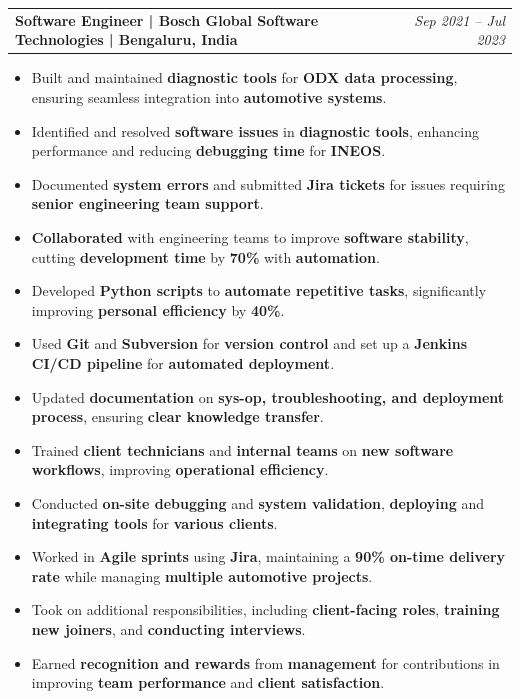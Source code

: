 \documentclass[a4paper,11pt]{article}
\makeatletter
\newcommand{\resumeExp}[2]{
\vspace{0mm}\item[]
    \begin{tabular*}{\textwidth}[t]{l@{\extracolsep{\fill}}r}
        \hspace{-4.4mm} \small\textbf{#1} & {\footnotesize{#2}} \vspace{-1.2mm} %
    \end{tabular*}
    \vspace*{-7mm}
}
\newcommand{\resumeItemListStart}{\begin{justify}\begin{itemize}[leftmargin=1.5ex, rightmargin=2ex, noitemsep,labelsep=1.2mm,itemsep=1mm]\small}
\newcommand{\resumeItemListEnd}{\end{itemize}\end{justify}}%
\makeatother
\begin{document}
\resumeExp
{Software Engineer\textnormal{ | Bosch Global Software Technologies | Bengaluru, India}}
{\textit{Sep 2021 – Jul 2023}}
\resumeItemListStart
\item[$\bullet$] Built and maintained \textbf{diagnostic tools} for \textbf{ODX data processing}, ensuring seamless integration into \textbf{automotive systems}.
\item[$\bullet$] Identified and resolved \textbf{software issues} in \textbf{diagnostic tools}, enhancing performance and reducing \textbf{debugging time} for \textbf{INEOS}.
\item[$\bullet$] Documented \textbf{system errors} and submitted \textbf{Jira tickets} for issues requiring \textbf{senior engineering team support}.
\item[$\bullet$] \textbf{Collaborated} with engineering teams to improve \textbf{software stability}, cutting \textbf{development time} by \textbf{70\%} with \textbf{automation}.
\item[$\bullet$] Developed \textbf{Python scripts} to \textbf{automate repetitive tasks}, significantly improving \textbf{personal efficiency} by \textbf{40\%}.
\item[$\bullet$] Used \textbf{Git} and \textbf{Subversion} for \textbf{version control} and set up a \textbf{Jenkins CI/CD pipeline} for \textbf{automated deployment}.
\item[$\bullet$] Updated \textbf{documentation} on \textbf{sys-op, troubleshooting, and deployment process}, ensuring \textbf{clear knowledge transfer}.
\item[$\bullet$] Trained \textbf{client technicians} and \textbf{internal teams} on \textbf{new software workflows}, improving \textbf{operational efficiency}.
\item[$\bullet$] Conducted \textbf{on-site debugging} and \textbf{system validation}, \textbf{deploying} and \textbf{integrating tools} for \textbf{various clients}.
\item[$\bullet$] Worked in \textbf{Agile sprints} using \textbf{Jira}, maintaining a \textbf{90\% on-time delivery rate} while managing \textbf{multiple automotive projects}.
\item[$\bullet$] Took on additional responsibilities, including \textbf{client-facing roles}, \textbf{training new joiners}, and \textbf{conducting interviews}.
\item[$\bullet$] Earned \textbf{recognition and rewards} from \textbf{management} for contributions in improving \textbf{team performance} and \textbf{client satisfaction}.
\resumeItemListEnd
\end{document}
